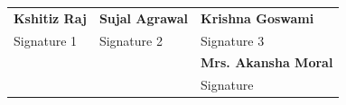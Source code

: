 \documentclass[12pt]{article}
\begin{document}
\vspace{0.5cm}
\begin{tabular}{ p{5.5cm} p{5.5cm} p{5.5cm}}
\textbf{Kshitiz Raj} & \textbf{Sujal Agrawal}  & \textbf{Krishna Goswami}  \\
Signature 1 & Signature 2 &  Signature 3  \\ [30pt]
 & & \textbf{Mrs. Akansha Moral} \\
& & Signature \\  [30pt]
\end{tabular}
\end{document}
